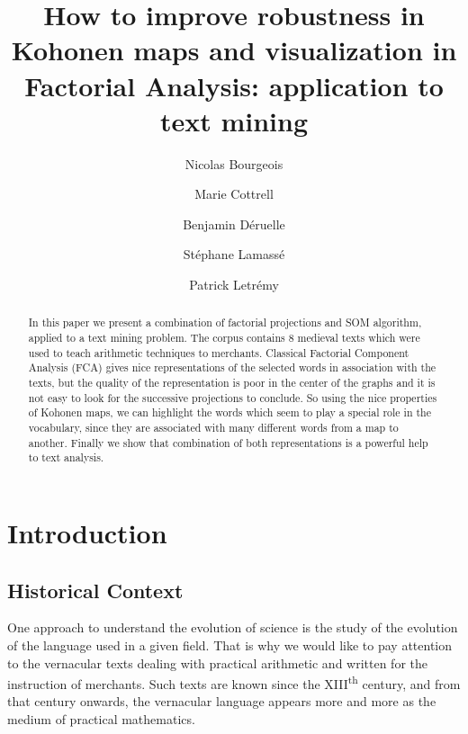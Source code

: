 \documentclass[preprint]{elsarticle}
\begin{document}
\begin{frontmatter}

\title{How to improve robustness in Kohonen maps and visualization in Factorial Analysis: application to text mining}

\author[samm]{Nicolas Bourgeois}
\author[samm]{Marie Cottrell}
\author[lamop]{Benjamin D\'eruelle}
\author[lamop]{St\'ephane Lamass\'e}
\author[samm]{Patrick Letr\'emy}

\address[samm]{SAMM - Universit\'e Paris 1 Panth\'eon-Sorbonne 90, rue de Tolbiac, 75013 Paris, France \mailENS,\mailSAMM}
\address[lamop]{PIREH-LAMOP - Universit\'e Paris 1 Panth\'eon-Sorbonne 1, rue Victor Cousin, Paris, France \mailLAMOP}


\begin{abstract}
In this paper we present a combination of factorial projections and SOM algorithm, applied to a text mining problem. The corpus contains 8 medieval texts which were used to teach arithmetic techniques to merchants. Classical Factorial Component Analysis (FCA) gives nice representations of the selected words in association with the texts, but the quality of the representation is poor in the center of the graphs and it is not easy to look for the successive projections to conclude. So using the nice properties of Kohonen maps, we can highlight the words which seem to play a special role in the vocabulary, since they are associated with many different words from a map to another. Finally we show that combination of both representations is a powerful help to text analysis.
\end{abstract}

\end{frontmatter}

\section*{Introduction}
\setcounter{footnote}{0}

\subsection*{Historical Context}

One approach to understand the evolution of science is the study of the evolution of the language used in a given field. That is why we would like to pay attention to the vernacular texts dealing with practical arithmetic and written for the instruction of merchants. Such texts are known since the XIII\textsuperscript{th} century, and from that century onwards,  the vernacular language appears more and more as the medium of practical mathematics.\\
\end{document}
